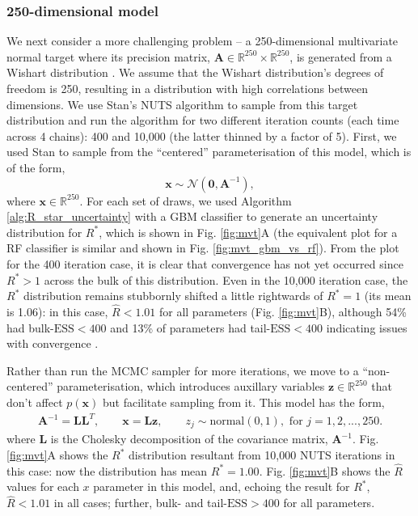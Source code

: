 \documentclass[ba]{imsart}
\numberwithin{equation}{section}
\theoremstyle{plain}
\begin{document}
\subsubsection{250-dimensional model}\label{sec:multivariate_normal_250}
We next consider a more challenging problem -- a 250-dimensional multivariate normal target where its precision matrix, $\boldsymbol{A}\in\mathbb{R}^{250}\times\mathbb{R}^{250}$, is generated from a Wishart distribution \citep{hoffman2014no}. We assume that the Wishart distribution's degrees of freedom is 250, resulting in a distribution with high correlations between dimensions. We use Stan's NUTS algorithm \citep{betancourt2017conceptual} to sample from this target distribution and run the algorithm for two different iteration counts (each time across 4 chains): 400 and 10,000 (the latter thinned by a factor of 5). First, we used Stan to sample from the ``centered'' parameterisation of this model, which is of the form,
%
\begin{equation}\label{eq:mvt_normal_250}
\boldsymbol{x}\sim \mathcal{N}(\boldsymbol{0},\boldsymbol{A}^{-1}),
\end{equation}
%
where $\boldsymbol{x}\in\mathbb{R}^{250}$. For each set of draws, we used Algorithm \ref{alg:R_star_uncertainty} with a GBM classifier to generate an uncertainty distribution for $R^*$, which is shown in Fig. \ref{fig:mvt}A (the equivalent plot for a RF classifier is similar and shown in Fig. \ref{fig:mvt_gbm_vs_rf}). From the plot for the 400 iteration case, it is clear that convergence has not yet occurred since $R^*>1$ across the bulk of this distribution. Even in the 10,000 iteration case, the $R^*$ distribution remains stubbornly shifted a little rightwards of $R^*=1$ (its mean is 1.06): in this case, $\widehat{R}<1.01$ for all parameters (Fig. \ref{fig:mvt}B), although 54\% had bulk-$\text{ESS}<400$ and 13\% of parameters had tail-$\text{ESS}<400$ indicating issues with convergence \citep{vehtari2019rank}.

Rather than run the MCMC sampler for more iterations, we move to a ``non-centered'' parameterisation, which introduces auxillary variables $\boldsymbol{z}\in\mathbb{R}^{250}$ that don't affect $p(\boldsymbol{x})$ but facilitate sampling from it. This model has the form,
%
\begin{align}
\boldsymbol{A}^{-1} = \boldsymbol{L}\boldsymbol{L}^T,\qquad
\boldsymbol{x} = \boldsymbol{L} \boldsymbol{z},\qquad
z_j\sim \text{normal}(0, 1), \text{ for } j = 1,2,...,250.
\end{align}
%
where $\boldsymbol{L}$ is the Cholesky decomposition of the covariance matrix, $\boldsymbol{A}^{-1}$. Fig. \ref{fig:mvt}A shows the $R^*$ distribution resultant from 10,000 NUTS iterations in this case: now the distribution has mean $R^*=1.00$. Fig. \ref{fig:mvt}B shows the $\widehat{R}$ values for each $x$ parameter in this model, and, echoing the result for $R^*$, $\widehat{R}<1.01$ in all cases; further, bulk- and tail-$\text{ESS}>400$ for all parameters.
\end{document}

